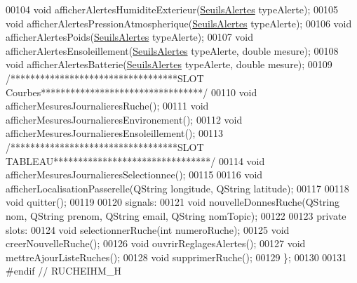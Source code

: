 \begin{DoxyCode}
00104     \textcolor{keywordtype}{void} afficherAlertesHumiditeExterieur(\hyperlink{parametres_8h_aaa6de8207c94675264c90b10b613368d}{SeuilsAlertes} typeAlerte);
00105     \textcolor{keywordtype}{void} afficherAlertesPressionAtmospherique(\hyperlink{parametres_8h_aaa6de8207c94675264c90b10b613368d}{SeuilsAlertes} typeAlerte);
00106     \textcolor{keywordtype}{void} afficherAlertesPoids(\hyperlink{parametres_8h_aaa6de8207c94675264c90b10b613368d}{SeuilsAlertes} typeAlerte);
00107     \textcolor{keywordtype}{void} afficherAlertesEnsoleillement(\hyperlink{parametres_8h_aaa6de8207c94675264c90b10b613368d}{SeuilsAlertes} typeAlerte, \textcolor{keywordtype}{double} mesure);
00108     \textcolor{keywordtype}{void} afficherAlertesBatterie(\hyperlink{parametres_8h_aaa6de8207c94675264c90b10b613368d}{SeuilsAlertes} typeAlerte, \textcolor{keywordtype}{double} mesure);
00109     \textcolor{comment}{/**********************************SLOT Courbes*********************************/}
00110     \textcolor{keywordtype}{void} afficherMesuresJournalieresRuche();
00111     \textcolor{keywordtype}{void} afficherMesuresJournalieresEnvironement();
00112     \textcolor{keywordtype}{void} afficherMesuresJournalieresEnsoleillement();
00113     \textcolor{comment}{/**********************************SLOT TABLEAU********************************/}
00114     \textcolor{keywordtype}{void} afficherMesuresJournalieresSelectionnee();
00115 
00116     \textcolor{keywordtype}{void} afficherLocalisationPasserelle(QString longitude, QString latitude);
00117 
00118     \textcolor{keywordtype}{void} quitter();
00119 
00120 signals:
00121     \textcolor{keywordtype}{void} nouvelleDonnesRuche(QString nom, QString prenom, QString email, QString nomTopic);
00122 
00123 \textcolor{keyword}{private} slots:
00124     \textcolor{keywordtype}{void} selectionnerRuche(\textcolor{keywordtype}{int} numeroRuche);
00125     \textcolor{keywordtype}{void} creerNouvelleRuche();
00126     \textcolor{keywordtype}{void} ouvrirReglagesAlertes();
00127     \textcolor{keywordtype}{void} mettreAjourListeRuches();
00128     \textcolor{keywordtype}{void} supprimerRuche();
00129 \};
00130 
00131 \textcolor{preprocessor}{#endif // RUCHEIHM\_H}
\end{DoxyCode}
